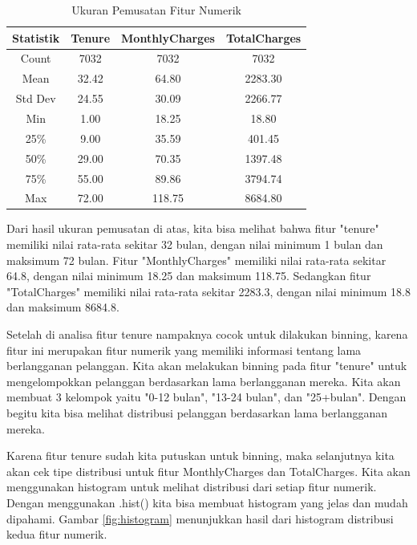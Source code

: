 \begin{table}[H]
    \centering
    \caption{Ukuran Pemusatan Fitur Numerik}
    \begin{tabular}{|c|c|c|c|}
        \hline
        \textbf{Statistik} & \textbf{Tenure} & \textbf{MonthlyCharges} & \textbf{TotalCharges} \\
        \hline
        Count & 7032 & 7032 & 7032 \\
        Mean & 32.42 & 64.80 & 2283.30 \\
        Std Dev & 24.55 & 30.09 & 2266.77 \\
        Min & 1.00 & 18.25 & 18.80 \\
        25\% & 9.00 & 35.59 & 401.45 \\
        50\% & 29.00 & 70.35 & 1397.48 \\
        75\% & 55.00 & 89.86 & 3794.74 \\
        Max & 72.00 & 118.75 & 8684.80 \\
        \hline
    \end{tabular}
\end{table}




Dari hasil ukuran pemusatan di atas, kita bisa melihat bahwa fitur "tenure" memiliki nilai rata-rata sekitar 32 bulan, dengan nilai minimum 1 bulan dan maksimum 72 bulan. Fitur "MonthlyCharges" memiliki nilai rata-rata sekitar 64.8, dengan nilai minimum 18.25 dan maksimum 118.75. Sedangkan fitur "TotalCharges" memiliki nilai rata-rata sekitar 2283.3, dengan nilai minimum 18.8 dan maksimum 8684.8.

Setelah di analisa fitur tenure nampaknya cocok untuk dilakukan binning, karena fitur ini merupakan fitur numerik yang memiliki informasi tentang lama berlangganan pelanggan. Kita akan melakukan binning pada fitur "tenure" untuk mengelompokkan pelanggan berdasarkan lama berlangganan mereka. Kita akan membuat 3 kelompok yaitu "0-12 bulan", "13-24 bulan", dan "25+bulan". Dengan begitu kita bisa melihat distribusi pelanggan berdasarkan lama berlangganan mereka.

Karena fitur tenure sudah kita putuskan untuk binning, maka selanjutnya kita akan cek tipe distribusi untuk fitur MonthlyCharges dan TotalCharges. Kita akan menggunakan histogram untuk melihat distribusi dari setiap fitur numerik. Dengan menggunakan .hist() kita bisa membuat histogram yang jelas dan mudah dipahami. Gambar \ref{fig:histogram} menunjukkan hasil dari histogram distribusi kedua fitur numerik.


